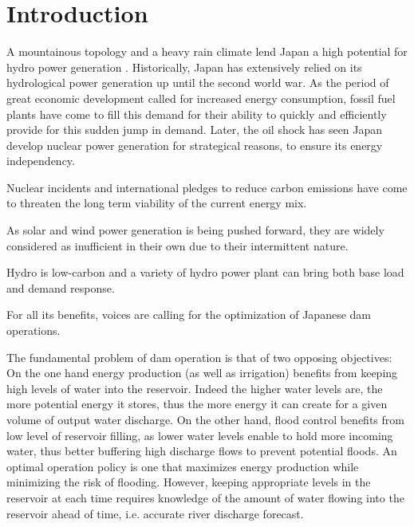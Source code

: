 \documentclass{article}
\begin{document}


\section{Introduction}
\label{sec:Introduction}

A mountainous topology and a heavy rain climate lend Japan a high potential for hydro power generation \cite{}. 
Historically\cite{}, Japan has extensively relied on its hydrological power generation up until the second world war.
As the period of great economic development called for increased energy consumption, 
fossil fuel plants have come to fill this demand for their ability to quickly and efficiently provide for this sudden jump in demand.
Later, the oil shock has seen Japan develop nuclear power generation for strategical reasons, to ensure its energy independency. 

Nuclear incidents and international pledges to reduce carbon emissions have come to threaten the long term viability of the current energy mix.

As solar and wind power generation is being pushed forward, 
they are widely considered as inufficient in their own due to their intermittent nature. \cite{}

Hydro is low-carbon and a variety of hydro power plant can bring both base load and demand response. 

For all its benefits, voices are calling for the optimization of Japanese dam operations. \cite{}

The fundamental problem of dam operation is that of two opposing objectives\cite{}:
On the one hand energy production (as well as irrigation) 
benefits from keeping high levels of water into the reservoir. 
Indeed the higher water levels are, the more potential energy it stores, 
thus the more energy it can create for a given volume of output water discharge. 
On the other hand, flood control benefits from low level of reservoir filling,
as lower water levels enable to hold more incoming water, 
thus better buffering high discharge flows to prevent potential floods. 
An optimal operation policy is one that maximizes energy production while minimizing the risk of flooding.
However, keeping appropriate levels in the reservoir at each time requires knowledge 
of the amount of water flowing into the reservoir ahead of time, i.e. accurate river discharge forecast.
\end{document}
